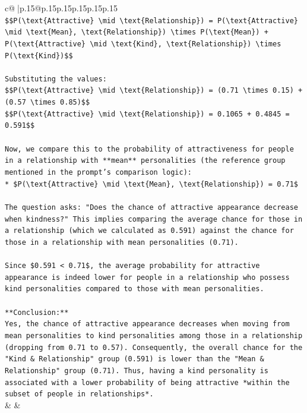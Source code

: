 \documentclass{article}
\begin{document}
{\begin{supertabular}{c@{$\;$}|p{.15\linewidth}@{}p{.15\linewidth}p{.15\linewidth}p{.15\linewidth}p{.15\linewidth}p{.15\linewidth}}
{{{\\ 
\texttt{\$\$P(\textbackslash{}text\{Attractive\} \textbackslash{}mid \textbackslash{}text\{Relationship\}) = P(\textbackslash{}text\{Attractive\} \textbackslash{}mid \textbackslash{}text\{Mean\}, \textbackslash{}text\{Relationship\}) \textbackslash{}times P(\textbackslash{}text\{Mean\}) + P(\textbackslash{}text\{Attractive\} \textbackslash{}mid \textbackslash{}text\{Kind\}, \textbackslash{}text\{Relationship\}) \textbackslash{}times P(\textbackslash{}text\{Kind\})\$\$} \\
\\ 
\texttt{Substituting the values:} \\
\texttt{\$\$P(\textbackslash{}text\{Attractive\} \textbackslash{}mid \textbackslash{}text\{Relationship\}) = (0.71 \textbackslash{}times 0.15) + (0.57 \textbackslash{}times 0.85)\$\$} \\
\texttt{\$\$P(\textbackslash{}text\{Attractive\} \textbackslash{}mid \textbackslash{}text\{Relationship\}) = 0.1065 + 0.4845 = 0.591\$\$} \\
\\ 
\texttt{Now, we compare this to the probability of attractiveness for people in a relationship with **mean** personalities (the reference group mentioned in the prompt's comparison logic):} \\
\texttt{*   \$P(\textbackslash{}text\{Attractive\} \textbackslash{}mid \textbackslash{}text\{Mean\}, \textbackslash{}text\{Relationship\}) = 0.71\$} \\
\\ 
\texttt{The question asks: "Does the chance of attractive appearance decrease when kindness?" This implies comparing the average chance for those in a relationship (which we calculated as 0.591) against the chance for those in a relationship with mean personalities (0.71).} \\
\\ 
\texttt{Since \$0.591 < 0.71\$, the average probability for attractive appearance is indeed lower for people in a relationship who possess kind personalities compared to those with mean personalities.} \\
\\ 
\texttt{**Conclusion:**} \\
\texttt{Yes, the chance of attractive appearance decreases when moving from mean personalities to kind personalities among those in a relationship (dropping from 0.71 to 0.57). Consequently, the overall chance for the "Kind \& Relationship" group (0.591) is lower than the "Mean \& Relationship" group (0.71). Thus, having a kind personality is associated with a lower probability of being attractive *within the subset of people in relationships*.} \\
            }
        }
    }
    & & \\ \\


\end{supertabular}}
\end{document}
